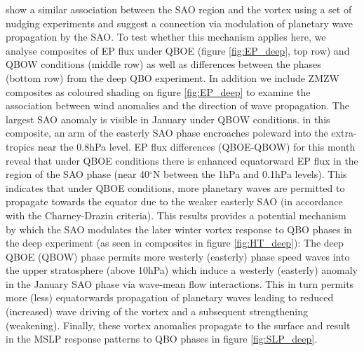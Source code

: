 \cite{grayForecasting2020a} show a similar association between the SAO region and the vortex using a set of nudging experiments and suggest a connection via modulation of planetary wave propagation by the SAO. To test whether this mechanism applies here, we analyse composites of EP flux under QBOE (figure \ref{fig:EP_deep}, top row) and QBOW conditions (middle row) as well as differences between the phases (bottom row) from the deep QBO experiment. In addition we include ZMZW composites as coloured shading on figure \ref{fig:EP_deep} to examine the association between wind anomalies and the direction of wave propagation. The largest SAO anomaly is visible in January under QBOW conditions. in this composite, an arm of the easterly SAO phase encroaches poleward into the extra-tropics near the 0.8hPa level. EP flux differences (QBOE-QBOW) for this month reveal that under QBOE conditions there is enhanced equatorward EP flux in the region of the SAO phase (near 40$^\circ$N between the 1hPa and 0.1hPa levels). This indicates that under QBOE conditions, more planetary waves are permitted to propagate towards the equator due to the weaker easterly SAO (in accordance with the Charney-Drazin criteria). This results provides a potential mechanism by which the SAO modulates the later winter vortex response to QBO phases in the deep experiment (as seen in composites in figure \ref{fig:HT_deep}): The deep QBOE (QBOW) phase permits more westerly (easterly) phase speed waves into the upper stratosphere (above 10hPa) which induce a westerly (easterly) anomaly in the January SAO phase via wave-mean flow interactions. This in turn permits more (less) equatorwards propagation of planetary waves leading to reduced (increased) wave driving of the vortex and a subsequent strengthening (weakening). Finally, these vortex anomalies propagate to the surface and result in the MSLP response patterns to QBO phases in figure \ref{fig:SLP_deep}.

